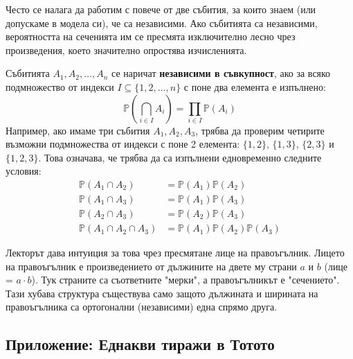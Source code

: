\documentclass{article}
\begin{document}
Често се налага да работим с повече от две събития, за които знаем (или допускаме в модела си), че са независими. Ако събитията са независими, вероятността на сеченията им се пресмята изключително лесно чрез произведения, което значително опростява изчисленията.

Събитията $A_1, A_2, \dots, A_n$ се наричат \textbf{независими в съвкупност}, ако за всяко подмножество от индекси $I \subseteq \{1, 2, \dots, n\}$ с поне два елемента е изпълнено:
\[
\mathbb{P}\left(\bigcap_{i \in I} A_i\right) = \prod_{i \in I} \mathbb{P}(A_i)
\]
Например, ако имаме три събития $A_1, A_2, A_3$, трябва да проверим четирите възможни подмножества от индекси с поне 2 елемента: $\{1, 2\}$, $\{1, 3\}$, $\{2, 3\}$ и $\{1, 2, 3\}$. Това означава, че трябва да са изпълнени едновременно следните условия:
\begin{align*}
\mathbb{P}(A_1 \cap A_2) &= \mathbb{P}(A_1)\mathbb{P}(A_2) \\
\mathbb{P}(A_1 \cap A_3) &= \mathbb{P}(A_1)\mathbb{P}(A_3) \\
\mathbb{P}(A_2 \cap A_3) &= \mathbb{P}(A_2)\mathbb{P}(A_3) \\
\mathbb{P}(A_1 \cap A_2 \cap A_3) &= \mathbb{P}(A_1)\mathbb{P}(A_2)\mathbb{P}(A_3)
\end{align*}

Лекторът дава интуиция за това чрез пресмятане лице на правоъгълник. Лицето на правоъгълник е произведението от дължините на двете му страни $a$ и $b$ (лице = $a \cdot b$). Тук страните са съответните "мерки", а правоъгълникът е "сечението". Тази хубава структура съществува само защото дължината и ширината на правоъгълника са ортогонални (независими) една спрямо друга.

\subsection{Приложение: Еднакви тиражи в Тотото}
\end{document}
